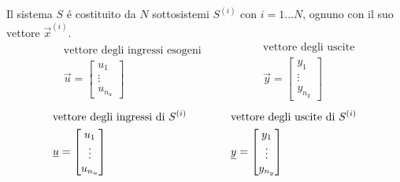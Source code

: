 \documentclass[../main.tex]{subfiles}
\begin{document}
	Il sistema $ S $ \'e costituito da $ N $ sottosistemi $ S^{(i)} $ con $ i = 1...N $, ognuno con il suo vettore $ \vec x^{(i)} $.
	\[
		\begin{aligned}
			&\text{vettore degli ingressi esogeni}
			\\
			&\vec u =
			\begin{bmatrix}
				u_1\\
				\vdots\\
				u_{n_u}
			\end{bmatrix}
		\end{aligned}
		\qquad\qquad
		\begin{aligned}
			&\text{vettore degli uscite}
			\\
			&\vec y =
			\begin{bmatrix}
				y_1\\
				\vdots\\
				y_{n_y}
			\end{bmatrix}
		\end{aligned}
	\]
	\[
		\begin{aligned}
			&\text{vettore degli ingressi di $ S^{(i)} $}
			\\
			&\vec u =
			\begin{bmatrix}
				u_1\\
				\vdots\\
				u_{n_u}
			\end{bmatrix}
		\end{aligned}
		\qquad\qquad
		\begin{aligned}
			&\text{vettore degli uscite di $ S^{(i)} $}
			\\
			&\vec y =
			\begin{bmatrix}
				y_1\\
				\vdots\\
				y_{n_y}
			\end{bmatrix}
		\end{aligned}
	\]
	
\end{document}
